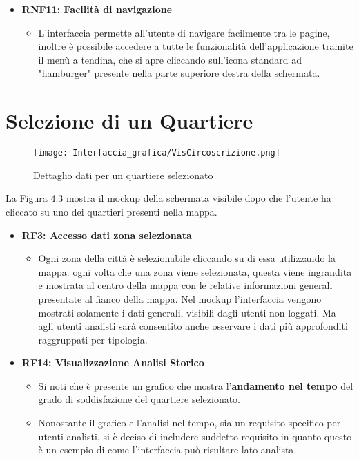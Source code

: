 \begin{itemize}
\begin{itemize}
        \end{itemize}
        \item \textbf{RNF11: Facilità di navigazione} \begin{itemize}
            \item L'interfaccia permette all'utente di navigare facilmente tra le pagine, inoltre è possibile accedere a tutte le funzionalità dell'applicazione tramite il menù a tendina, che si apre cliccando sull'icona standard ad "hamburger" presente nella parte superiore destra della schermata.
            \end{itemize}
    \end{itemize}
\newpage
\section{Selezione di un Quartiere}
    \begin{figure}[H]
        \center
        \texttt{[image: Interfaccia\_grafica/VisCircoscrizione.png]}
        \caption{Dettaglio dati per un quartiere selezionato}
    \end{figure}    

    La Figura 4.3 mostra il mockup della schermata visibile dopo che l'utente ha cliccato su uno dei quartieri presenti nella mappa.

    \begin{itemize}
        \item \textbf{RF3: Accesso dati zona selezionata} \begin{itemize}
            \item Ogni zona della città è selezionabile cliccando su di essa utilizzando la mappa. ogni volta che una zona viene selezionata, questa viene ingrandita e mostrata al centro della mappa con le relative informazioni generali  presentate al fianco della mappa. Nel mockup l'interfaccia vengono mostrati solamente i dati generali, visibili dagli utenti non loggati. Ma agli utenti analisti sarà consentito anche osservare i dati più approfonditi raggruppati per tipologia.
        \end{itemize} 
        \item \textbf{RF14: Visualizzazione Analisi Storico} \begin{itemize}
            \item Si noti che è presente un grafico che mostra l'\textbf{andamento nel tempo} del grado di soddisfazione del quartiere selezionato.
            \item Nonostante il grafico e l'analisi nel tempo, sia un requisito specifico per utenti analisti, si è deciso di includere suddetto requisito in quanto questo è un esempio di come l'interfaccia può risultare lato analista.
        \end{itemize}
    \end{itemize}
